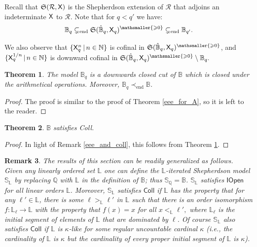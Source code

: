\documentclass{amsart}
\renewcommand{\geq}{\geqslant}
\newtheorem{theorem}{Theorem}[section]
\newtheorem{rem}[theorem]{Remark}
\newcommand{\mc}[1]{\mathcal #1}
\newcommand{\X}{{\sf X}}
\newcommand{\shef}{\mathfrak{S}}
\begin{document}
Recall that $\shef(\mc R, \X)$ is the Shepherdson extension of $\mc R$ that adjoins an indeterminate $\X$ to $\mc R$. Note that for $q<q'$ we have: $$\mathbb{B}_q\subsetneq_{\mathrm{end}} \shef(\hat{\mathbb{B}}_q, \X_q)^{\mathsmaller{\geq 0}}\subsetneq_{\mathrm{end}} \mathbb{B}_{q'}.$$ 

We also observe that $\{\X_{q}^{n} \mathop\mid n\in \mathbb{N}\}$ is cofinal in $\shef(\hat{\mathbb{B}}_q, \X_q)^{\mathsmaller{\geq 0}}$, and 
$\{\X_{q}^{1/n} \mathop\mid n\in \mathbb{N}\}$ is downward cofinal in $\shef(\hat{\mathbb{B}}_q, \X_q)^{\mathsmaller{\geq 0}} \setminus \mathbb{B}_q.$



\begin{theorem}\label{eee_for_B}
   The model $\mathbb B_q$ is a downwards closed cut of $\mathbb B$ which is closed under the arithmetical
   operations. Moreover, $\mathbb B_q \prec_{\mathrm{end}} \mathbb{B}$.
\end{theorem}
\begin{proof} 
The proof is similar to the proof of Theorem \ref{eee_for_A}, so it is left to the reader. 
 \end{proof}
 
\begin{theorem}
    $\mathbb B$ satisfies {\sf Coll}.
\end{theorem}
\begin{proof} In light of Remark \ref{eee_and_coll}, this follows from Theorem \ref{eee_for_B}.
    \end{proof}

\begin{rem} The results of this section can be readily generalized as follows. Given any linearly ordered set $\mathbb{L}$ one can define the $\mathbb{L}$-iterated Shepherdson model $\mathbb{S}_{\mathbb{L}}$ by replacing $\mathbb{Q}$ with $\mathbb{L}$ in the definition of $\mathbb{B}$; thus $\mathbb{S}_{\mathbb{Q}} = \mathbb{B}$. $\mathbb{S}_{\mathbb{L}}$ satisfies $\mathsf{IOpen}$ for all linear orders $\mathbb{L}$. Moreover, $\mathbb{S}_{\mathbb{L}}$ satisfies $\mathsf{Coll}$ if $\mathbb{L}$ has the property that for any $\ell'\in \mathbb{L}$, there is some $\ell >_{\mathbb{L}} \ell'$ in $\mathbb{L}$ such that there is an order isomorphism $f: \mathbb{L}_{\ell} \rightarrow \mathbb{L}$ with the property that $f(x)=x$ for all $x<_{\mathbb{L}} \ell',$ where $\mathbb{L}_{\ell}$ is the initial segment of elements of $\mathbb{L}$ that are dominated by $\ell$. Of course $\mathbb{S}_{\mathbb{L}}$ also satisfies $\mathsf{Coll}$ if $\mathbb{L}$ is $\kappa$-like for some regular uncountable cardinal $\kappa$ (i.e., the cardinality of $\mathbb{L}$ is $\kappa$ but the cardinality of every proper initial segment of $\mathbb{L}$ is $\kappa$).
\end{rem}
\end{document}
